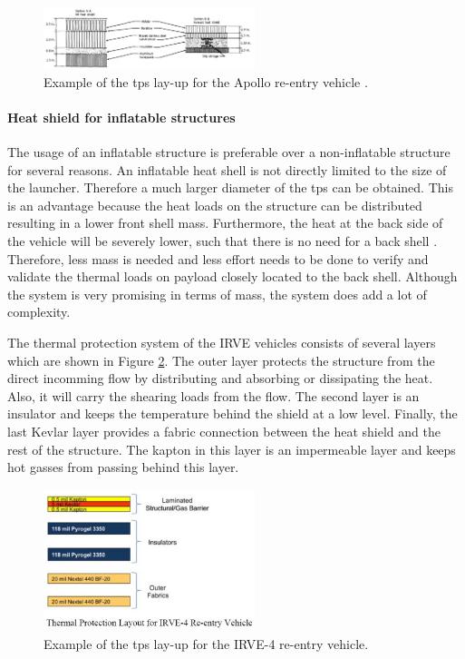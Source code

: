 \begin{figure}[H]
\centering
\includegraphics[width = 0.55\textwidth]{Figure/tpsApollo.png}
\caption[Example of the \gls{tps} lay-up for the Apollo re-entry vehicle]{Example of the \gls{tps} lay-up for the Apollo re-entry vehicle \cite[p.5]{Pavlosky1974}.}
\label{fig:tpslayupapollo}
\end{figure}

\paragraph{Heat shield for inflatable structures}
The usage of  an inflatable structure is preferable over a non-inflatable structure for several reasons. An inflatable heat shell is not directly limited to the size of the launcher. Therefore a much larger diameter of the \gls{tps} can be obtained. This is an advantage because the heat loads on the structure can be distributed resulting in a lower front shell mass. Furthermore, the heat at the back side of the vehicle will be severely lower, such that there is no need for a back shell \cite{Hughes2005}. Therefore, less mass is needed and less effort needs to be done to verify and validate the thermal loads on payload closely located to the back shell. Although the system is very promising in terms of mass, the system does add a lot of complexity. 

The thermal protection system of the IRVE vehicles consists of several layers \cite{Litton} which are shown in Figure \ref{fig:tpslayup}. The outer layer protects the structure from the direct incomming flow by distributing and absorbing or dissipating the heat. Also, it will carry the shearing loads from the flow. The second layer is an insulator and keeps the temperature behind the shield at a low level. Finally, the last Kevlar layer provides a fabric connection between the heat shield and the rest of the structure. The kapton in this layer is an impermeable layer and keeps hot gasses from passing behind this layer.

\begin{figure}[H]
\centering
\includegraphics[width = 0.55\textwidth]{Figure/IRVE4TPS.jpg}
\caption[Example of the tps lay-up for the IRVE-4 re-entry vehicle]{Example of the tps lay-up for the IRVE-4 re-entry vehicle\cite[p.6]{Litton}.}
\label{fig:tpslayup}
\end{figure}

